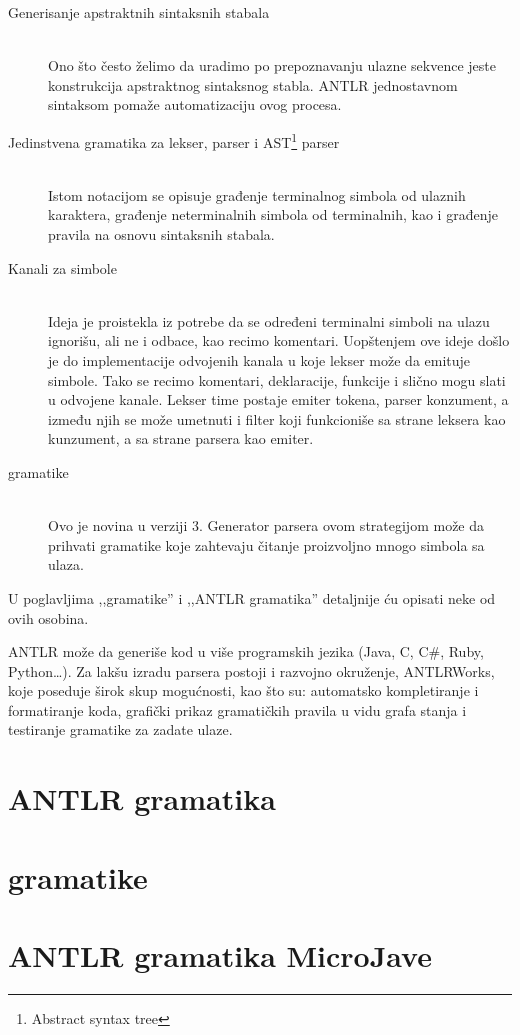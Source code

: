 \begin{description}
	\item[Generisanje apstraktnih sintaksnih stabala] \hfill \\
	Ono što često želimo da uradimo po prepoznavanju ulazne sekvence jeste konstrukcija apstraktnog sintaksnog stabla. ANTLR jednostavnom sintaksom pomaže automatizaciju ovog procesa.
	\item[Jedinstvena gramatika za lekser, parser i AST\footnote{\skr \eng Abstract syntax tree}  parser] \hfill \\
	Istom notacijom se opisuje građenje terminalnog simbola od ulaznih karaktera, građenje neterminalnih simbola od terminalnih, kao i građenje pravila na osnovu sintaksnih stabala.
	\item[Kanali za simbole] \hfill \\
	Ideja je proistekla iz potrebe da se određeni terminalni simboli na ulazu ignorišu, ali ne i odbace, kao recimo komentari. 
Uopštenjem ove ideje došlo je do implementacije odvojenih kanala u koje lekser može da emituje simbole. Tako se recimo komentari, deklaracije, funkcije i slično mogu slati u odvojene kanale. 
Lekser time postaje emiter tokena, parser konzument, a između njih se može umetnuti i filter koji funkcioniše sa strane leksera kao kunzument, a sa strane parsera kao emiter.
	\item [\LLa gramatike] \hfill \\
	Ovo je novina u verziji 3. Generator parsera ovom strategijom može da prihvati gramatike koje zahtevaju čitanje proizvoljno mnogo simbola sa ulaza.

\end{description}

U poglavljima ,,\LLa gramatike'' i ,,ANTLR gramatika'' detaljnije ću opisati neke od ovih osobina.
  
ANTLR može da generiše kod u više programskih jezika (Java, C, C\#, Ruby, Python\ldots). 
Za lakšu izradu parsera postoji i razvojno okruženje, ANTLRWorks, koje poseduje širok skup mogućnosti, kao što su: 
automatsko kompletiranje i formatiranje koda, grafički prikaz gramatičkih pravila u vidu grafa stanja i testiranje gramatike za zadate ulaze.


\section{ANTLR gramatika}


\section{\LLa gramatike}





\section{ANTLR gramatika MicroJave}
